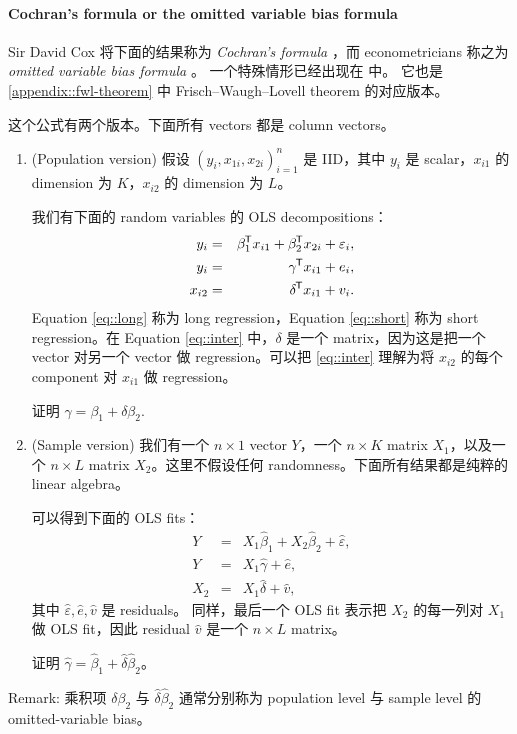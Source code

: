 \paragraph{Cochran's formula or the omitted variable bias formula}
\label{hw::cochran+ovb}



Sir David Cox 将下面的结果称为 {\it Cochran's formula} \citep{cochran1938omission, cox2007generalization}，而 econometricians 称之为 {\it omitted variable bias formula} \citep{angrist2008mostly}。
一个特殊情形已经出现在 \citet{fisher1925statistical} 中。
它也是 \cref{appendix::fwl-theorem} 中 Frisch--Waugh--Lovell theorem 的对应版本。

这个公式有两个版本。下面所有 vectors 都是 column vectors。

\begin{enumerate}
[(1)]
\item
(Population version) 假设 $(y_i, x_{1i}, x_{2i})_{i=1}^n$ 是 IID，其中 $y_i$ 是 scalar，$x_{i1}$ 的 dimension 为 $K$，$x_{i2}$ 的 dimension 为 $L$。

我们有下面的 random variables 的 OLS decompositions：
\begin{eqnarray}
y_i &=& \beta_1 ^{\mkern-1.5mu\mathsf{T}} x_{i1} + \beta_2  ^{\mkern-1.5mu\mathsf{T}} x_{2i} + \varepsilon_i , \label{eq::long}\\
y_i&=&\gamma  ^{\mkern-1.5mu\mathsf{T}} x_{i1} + e_i, \label{eq::short}\\
x_{i2} &=& \delta  ^{\mkern-1.5mu\mathsf{T}} x_{i1} + v_i . \label{eq::inter}
\end{eqnarray}
Equation \eqref{eq::long} 称为 long regression，Equation \eqref{eq::short} 称为 short regression。在 Equation \eqref{eq::inter} 中，$\delta$ 是一个 matrix，因为这是把一个 vector 对另一个 vector 做 regression。可以把 \eqref{eq::inter} 理解为将 $x_{i2}$ 的每个 component 对 $x_{i1}$ 做 regression。

证明 $\gamma = \beta_1 + \delta \beta_2.$


\item
(Sample version) 我们有一个 $n\times 1$ vector $Y$，一个 $n\times K$ matrix $X_1$，以及一个 $n\times L$ matrix $X_2$。这里不假设任何 randomness。下面所有结果都是纯粹的 linear algebra。

可以得到下面的 OLS fits：
\begin{eqnarray*}
Y &=& X_1 \hat{\beta}_1 + X_2 \hat{\beta}_2+ \hat{\varepsilon},\\
Y &=& X_1 \hat{\gamma} + \hat{e} ,\\
X_2 &=& X_1 \hat{\delta} + \hat{v},
\end{eqnarray*}
其中 $\hat{\varepsilon},  \hat{e}, \hat{v}$ 是 residuals。
同样，最后一个 OLS fit 表示把 $X_2$ 的每一列对 $X_1$ 做 OLS fit，因此 residual $\hat{v}$ 是一个 $n\times L$ matrix。

证明 $\hat{\gamma} = \hat{\beta}_1 +  \hat{\delta} \hat{\beta}_2$。

\end{enumerate}

 
Remark: 乘积项 $\delta \beta_2$ 与 $\hat{\delta} \hat{\beta}_2$ 通常分别称为 population level 与 sample level 的 omitted-variable bias。
 
 
 
